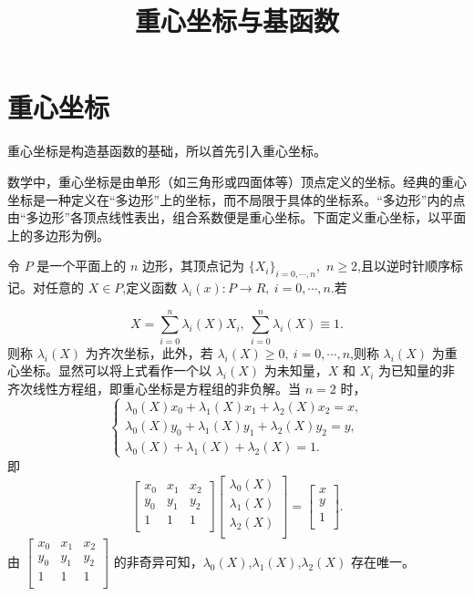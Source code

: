 \documentclass{article}
\begin{document}
\title{重心坐标与基函数}
\maketitle
\section{重心坐标}
重心坐标是构造基函数的基础，所以首先引入重心坐标。

数学中，重心坐标是由单形（如三角形或四面体等）顶点定义的坐标。经典的重心坐标是一种定义在“多边形”上的坐标，而不局限于具体的坐标系。“多边形”内的点由“多边形”各顶点线性表出，组合系数便是重心坐标。下面定义重心坐标，以平面上的多边形为例。

令 $P$ 是一个平面上的 $n$ 边形，其顶点记为 $\lbrace X_i\rbrace_{i=0,\cdots,n}$,~$n\ge 2$,且以逆时针顺序标记。对任意的 $X\in P$,定义函数 $\lambda _i(x):P\longrightarrow R,~i=0,\cdots,n$.若

$$
X=\sum_{i=0}^n \lambda _i(X)X_i,~\sum_{i=0}^n\lambda _i(X)\equiv 1.
$$
则称 $\lambda _i(X)$ 为齐次坐标，此外，若 $\lambda _i(X)\ge 0,~i=0,\cdots,n$,则称 $\lambda _i(X)$ 为重心坐标。显然可以将上式看作一个以 $\lambda _i(X)$ 为未知量，$X$ 和 $X_i$ 为已知量的非齐次线性方程组，即重心坐标是方程组的非负解。当 $n=2$ 时，
$$
\begin{cases}
\lambda _0(X)x_0+\lambda _1(X)x_1+\lambda _2(X)x_2=x,\\
\lambda _0(X)y_0+\lambda _1(X)y_1+\lambda _2(X)y_2=y,\\
\lambda _0(X)+\lambda _1(X)+\lambda _2(X)=1.
\end{cases}
$$
即
$$
\begin{bmatrix}
x_0 & x_1 & x_2\\
y_0 & y_1 & y_2\\
1 & 1 & 1\\
\end{bmatrix}
\begin{bmatrix}
\lambda _0(X)\\
\lambda _1(X)\\
\lambda _2(X)\\
\end{bmatrix}=\begin{bmatrix}
x\\
y\\
1\\
\end{bmatrix}.
$$
由 $\begin{bmatrix}
x_0 & x_1 & x_2\\
y_0 & y_1 & y_2\\
1 & 1 & 1\\
\end{bmatrix}$ 的非奇异可知，$\lambda _0(X)$,$\lambda _1(X)$,$\lambda _2(X)$ 存在唯一。
\end{document}
